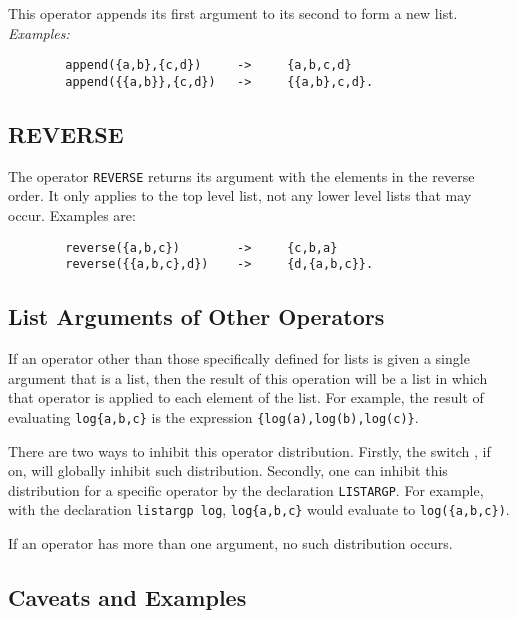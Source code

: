 This operator appends its first argument to its second to
form a new list.
\textit{Examples:}
\begin{verbatim}
        append({a,b},{c,d})     ->     {a,b,c,d}
        append({{a,b}},{c,d})   ->     {{a,b},c,d}.
\end{verbatim}

\subsection{REVERSE}
\hypertarget{operator:REVERSE}{}

The operator \texttt{REVERSE} returns its argument with the
elements in the reverse order.  It only applies to the top level list, not
any lower level lists that may occur.  Examples are:
\begin{verbatim}
        reverse({a,b,c})        ->     {c,b,a}
        reverse({{a,b,c},d})    ->     {d,{a,b,c}}.
\end{verbatim}

\subsection{List Arguments of Other Operators}
\hypertarget{switch:LISTARGS}{}
\hypertarget{command:LISTARGP}{}

If an operator other than those specifically defined for lists is given a
single argument that is a list, then the result of this operation will be
a list in which that operator is applied to each element of the list.  For
example, the result of evaluating \texttt{log\{a,b,c\}} is the expression
\texttt{\{log(a),log(b),log(c)\}}.

There are two ways to inhibit this operator distribution.  Firstly, the
switch , if on, will globally inhibit
such distribution.  Secondly, one can inhibit this distribution for a
specific operator by the declaration \texttt{LISTARGP}. For
example, with the declaration \texttt{listargp log}, \texttt{log\{a,b,c\}}
 would evaluate to \texttt{log(\{a,b,c\})}.

If an operator has more than one argument, no such distribution occurs.

\subsection{Caveats and Examples}

